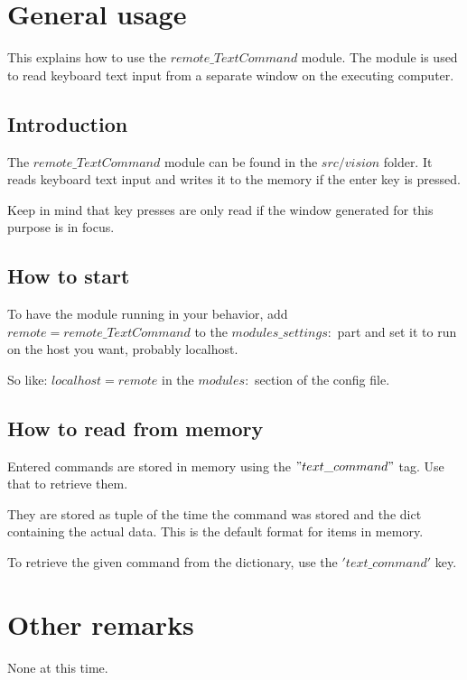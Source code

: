 \documentclass[a4paper, 12pt, oneside]{report}
\title{\titleVariable}
\author{\authorVariable}
\date{\centering First release: \firstRelease \\ Last modification: \today}
\begin{document}
\maketitle

\chapter{General usage}

This explains how to use the $remote\_TextCommand$ module. The module is used to read keyboard text input from a separate window on the executing computer.

\section{Introduction}

The $remote\_TextCommand$ module can be found in the $src/vision$ folder. It reads keyboard text input and writes it to the memory if the enter key is pressed. 

Keep in mind that key presses are only read if the window generated for this purpose is in focus.

\section{How to start}

To have the module running in your behavior, add $remote = remote\_TextCommand$ to the $modules\_settings:$ part and set it to run on the host you want, probably localhost. 

So like: $localhost = remote$ in the $modules:$ section of the config file.

\section{How to read from memory}

Entered commands are stored in memory using the $"text\_command"$ tag. Use that to retrieve them. 

They are stored as tuple of the time the command was stored and the dict containing the actual data. This is the default format for items in memory.

To retrieve the given command from the dictionary, use the $'text\_command'$ key.

\chapter{Other remarks}

None at this time.
\end{document}
